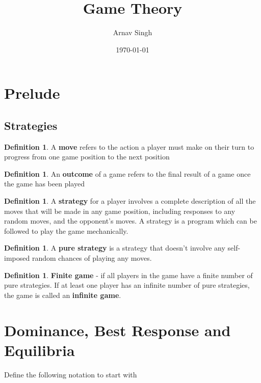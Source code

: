 \documentclass[11pt]{article}
\title{Game Theory}
\author{Arnav Singh}
\date{\today}
\theoremstyle{plain}
\theoremstyle{definition}
\newtheorem{definition}[theorem]{Definition}
\theoremstyle{remark}
\begin{document}
\maketitle
\tableofcontents
\newpage

\section{Prelude}

\setcounter{subsection}{4} 
\subsection{Strategies}

\begin{definition}
    A \textbf{move} refers to the action a player must make on their turn to progress from one game position to the next position
\end{definition}

\begin{definition}
    An \textbf{outcome} of a game refers to the final result of a game once the game has been played
\end{definition}

\begin{definition}
    A \textbf{strategy} for a player involves a complete description of all the moves that will be made in any game position, including responses to any random moves, and the opponent's moves. A strategy is a program which can be followed to play the game mechanically.
\end{definition}

\begin{definition}
    A \textbf{pure strategy} is a strategy that doesn't involve any self-imposed random chances of playing any moves.
\end{definition}

\begin{definition}
    \textbf{Finite game} - if all players in the game have a finite number of pure strategies. If at least one player has an infinite number of pure strategies, the game is called an \textbf{infinite game}.
\end{definition}

\section{Dominance, Best Response and Equilibria}

Define the following notation to start with
\end{document}
